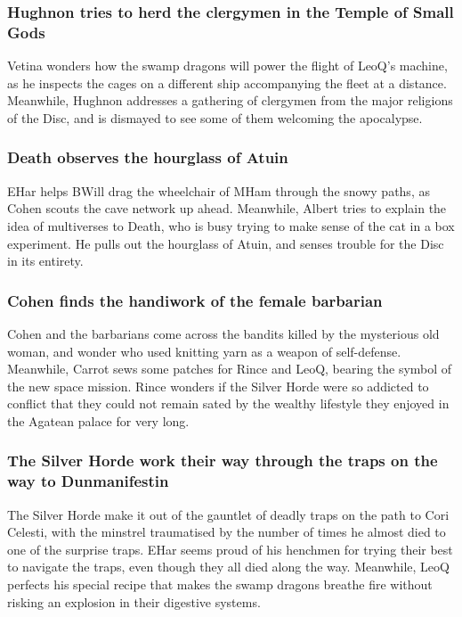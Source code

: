 \subsubsection{\Gls{Hughnon} tries to herd the clergymen in the Temple of Small Gods}
\Gls{Vetina} wonders how the swamp dragons will power the flight of \Gls{LeoQ}'s machine, as he
inspects the cages on a different ship accompanying the fleet at a distance. Meanwhile,
\Gls{Hughnon} addresses a gathering of clergymen from the major religions of the Disc, and is
dismayed to see some of them welcoming the apocalypse.

\subsubsection{\Gls{Death} observes the hourglass of \Gls{Atuin}}
\Gls{EHar} helps \Gls{BWill} drag the wheelchair of \Gls{MHam} through the snowy paths, as
\Gls{Cohen} scouts the cave network up ahead. Meanwhile, \Gls{Albert} tries to explain the idea of
multiverses to \Gls{Death}, who is busy trying to make sense of the cat in a box experiment. He
pulls out the hourglass of \Gls{Atuin}, and senses trouble for the Disc in its entirety.

\subsubsection{\Gls{Cohen} finds the handiwork of the female barbarian}
\Gls{Cohen} and the barbarians come across the bandits killed by the mysterious old woman, and
wonder who used knitting yarn as a weapon of self-defense. Meanwhile, \Gls{Carrot} sews some
patches for \Gls{Rince} and \Gls{LeoQ}, bearing the symbol of the new space mission. \Gls{Rince}
wonders if the Silver Horde were so addicted to conflict that they could not remain sated by the
wealthy lifestyle they enjoyed in the Agatean palace for very long.

\subsubsection{The Silver Horde work their way through the traps on the way to Dunmanifestin}
The Silver Horde make it out of the gauntlet of deadly traps on the path to Cori Celesti, with the
minstrel traumatised by the number of times he almost died to one of the surprise traps. \Gls{EHar}
seems proud of his henchmen for trying their best to navigate the traps, even though they all died
along the way. Meanwhile, \Gls{LeoQ} perfects his special recipe that makes the swamp dragons
breathe fire without risking an explosion in their digestive systems.


